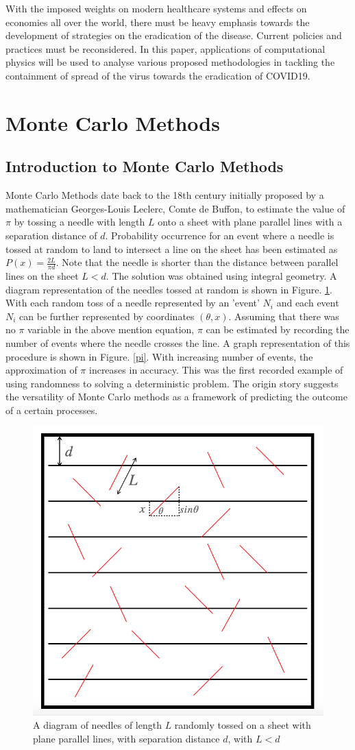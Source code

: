 \documentclass[11pt]{report}
\begin{document}
With the imposed weights on modern healthcare systems and effects on economies all over the world, there must be heavy emphasis towards the development of strategies on the eradication of the disease. Current policies and practices must be reconsidered. In this paper, applications of computational physics will be used to analyse various proposed methodologies in tackling the containment of spread of the virus towards the eradication of COVID19.

\section{Monte Carlo Methods}

\subsection{Introduction to Monte Carlo Methods}

Monte Carlo Methods date back to the 18th century initially proposed by a mathematician Georges-Louis Leclerc, Comte de Buffon, to estimate the value of $\pi$ by tossing a needle with length $L$ onto a sheet with plane parallel lines with a separation distance of $d$. Probability occurrence for an event where a needle is tossed at random to land to intersect a line on the sheet has been estimated as $P(x)=\frac{2L}{\pi d}$. Note that the needle is shorter than the distance between parallel lines on the sheet $L<d$. The solution was obtained using integral geometry. A diagram representation of the needles tossed at random is shown in Figure. \ref{Needle}.  With each random toss of a needle represented by an 'event' $N_i$ and each event $N_i$ can be further represented by coordinates $(\theta, x)$. Assuming that there was no $\pi$ variable in the above mention equation, $\pi$ can be estimated by recording the number of events where the needle crosses the line. A graph representation of this procedure is shown in Figure. \ref{pi}. With increasing number of events, the approximation of $\pi$ increases in accuracy. This was the first recorded example of using randomness to solving a deterministic problem. The origin story suggests the versatility of Monte Carlo methods as a framework of predicting the outcome of a certain processes.


\begin{figure}[h!]
    \centering
    \includegraphics[width=.30\textwidth,clip]{Needle.png}
    \caption{A diagram of needles of length $L$ randomly tossed on a sheet with plane parallel lines, with separation distance $d$, with $L<d$}
    \label{Needle}
\end{figure}
\end{document}
